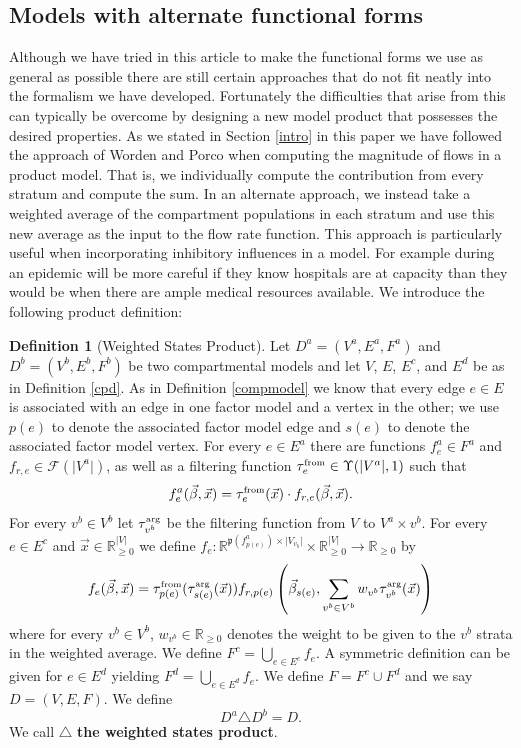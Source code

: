 \documentclass{article}
\theoremstyle{definition}
\newtheorem{definition}{Definition}
\newcommand{\R}{\mathbb{R}}%
\newcommand{\Rnn}{\mathbb{R}_{\ge 0}}%
\newcommand{\abs}[1]{\lvert #1 \rvert}%
\newcommand{\pardim}[1]{\mathfrak{p}(#1)}%
\newcommand{\betavec}{\vec{\beta}}
\newcommand{\xvec}{\vec{x}}
\newcommand{\fr}{\ensuremath{\mathcal F}}
\newcommand{\tauf}{\tau^{\mbox{\tiny from}}}
\newcommand{\taua}{\tau^{\mbox{\tiny arg}}}
\begin{document}
\subsection{Models with alternate functional forms}\label{aff}
Although we have tried in this article to make the functional forms we use as general as possible there are still certain approaches that do not fit neatly into the formalism we have developed. Fortunately the difficulties that arise from this can typically be overcome by designing a new model product that possesses the desired properties. As we stated in Section \ref{intro} in this paper we have followed the approach of Worden and Porco when computing the magnitude of flows in a product model. That is, we individually compute the contribution from every stratum and compute the sum. In an alternate approach, we instead take a weighted average of the compartment populations in each stratum and use this new average as the input to the flow rate function. This approach is particularly useful when incorporating inhibitory influences in a model. For example during an epidemic will be more careful if they know hospitals are at capacity than they would be when there are ample medical resources available. We introduce the following product definition:

\begin{definition}[Weighted States Product]
    Let $D^a = (V^a, E^a, F^a)$ and $D^b = (V^b, E^b, F^b)$ be two compartmental models and let $V$, $E$, $E^c$, and $E^d$ be as in Definition \ref{cpd}. As in Definition \ref{compmodel} we know that every edge $e\in E$ is associated with an edge in one factor model and a vertex in the other; we use $p(e)$ to denote the associated factor model edge and $s(e)$ to denote the associated factor model vertex. For every $e\in E^a$ there are functions $f^a_{e}\in F^a$ and $f_{r,e}\in \fr(\abs{V^a})$, as well as a filtering function $\tauf_{e}\in\Upsilon(\abs{V^a}, 1)$ such that
    \begin{equation}
        f^a_{e}(\betavec, \xvec) = \tauf_e(\xvec)\cdot f_{r,e}(\betavec, \xvec).
    \end{equation}
        For every $v^b\in V^b$ let $\taua_{v^b}$ be the filtering function from $V$ to $V^a\times v^b$. For every $e\in E^c$ and $\vec{x}\in\Rnn^{\abs{V}}$ we define $f_e:\R^{\pardim{f^a_{p(e)}}\times \abs{V_{v_b}}}\times\Rnn^{\abs{V}}\rightarrow\Rnn$ by
     \begin{equation}
        f_e(\vec{\beta}, \vec{x}) = \tauf_{p(e)}(\taua_{s(e)}(\xvec)) f_{r,p(e)}\left(\betavec_{s(e)},\sum\limits_{v^b\in V^b} w_{v^b}\taua_{v^b}(\xvec)\right)
     \end{equation}
     where for every $v^b\in V^b$, $w_{v^b}\in\Rnn$ denotes the weight to be given to the $v^b$ strata in the weighted average. We define $F^{c} = \bigcup\limits_{e\in E^c}f_e$. A symmetric definition can be given for $e\in E^d$ yielding $F^{d} = \bigcup\limits_{e\in E^d}f_e$. We define $F = F^{c}\cup F^{d}$ and we say $D=(V, E, F)$. We define
    \begin{equation}
        D^a\triangle D^b = D.
    \end{equation} We call $\triangle$ \textbf{the weighted states product}.
\end{definition}
\end{document}
